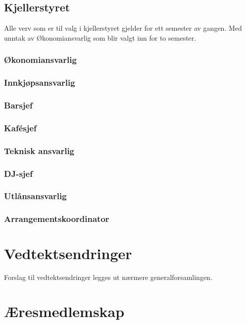 \documentclass[10pt,norsk,a4paper]{article}
\begin{document}
\begin{minipage}[t]{0.49\textwidth}
\subsection{Kjellerstyret} %
Alle verv som er til valg i kjellerstyret gjelder for ett semester av gangen. Med unntak av Økonomiansvarlig som blir valgt inn for to semester.

\subsubsection{Økonomiansvarlig}
\subsubsection{Innkjøpsansvarlig}
\subsubsection{Barsjef}
\subsubsection{Kafésjef}
\subsubsection{Teknisk ansvarlig}
\subsubsection{DJ-sjef}
\subsubsection{Utlånsansvarlig}
\subsubsection{Arrangementskoordinator}

\end{minipage}

\newpage

\section{Vedtektsendringer}
Forslag til vedtektsendringer legges ut nærmere generalforsamlingen.

\section{Æresmedlemskap}
\end{document}
